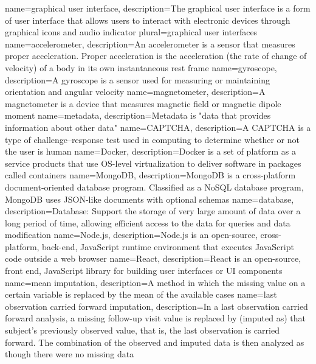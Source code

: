 {
    name={graphical user interface},
    description={The graphical user interface is a form of user interface that allows users to interact with electronic devices through graphical icons and audio indicator}
    plural={graphical user interfaces}
}
{
    name={accelerometer},
    description={An accelerometer is a sensor that measures proper acceleration. Proper acceleration is the acceleration (the rate of change of velocity) of a body in its own instantaneous rest frame
    }
}
{
    name={gyroscope},
    description={A gyroscope is a sensor used for measuring or maintaining orientation and angular velocity
    }
}
{
    name={magnetometer},
    description={A magnetometer is a device that measures magnetic field or magnetic dipole moment}
}
{
    name={metadata},
    description={Metadata is "data that provides information about other data"}
}
{
    name={CAPTCHA},
    description={A CAPTCHA is a type of challenge–response test used in computing to determine whether or not the user is human}
}
{
    name={Docker},
    description={Docker is a set of platform as a service products that use OS-level virtualization to deliver software in packages called containers}
}
{
    name={MongoDB},
    description={MongoDB is a cross-platform document-oriented database program. Classified as a NoSQL database program, MongoDB uses JSON-like documents with optional schemas}
}
{
    name={database},
    description={Database: Support the storage of very large amount of data over a long period of time, allowing efficient access to the data for queries and data modification}
}
{
    name={Node.js},
    description={Node.js is an open-source, cross-platform, back-end, JavaScript runtime environment that executes JavaScript code outside a web browser}
}
{
    name={React},
    description={React is an open-source, front end, JavaScript library for building user interfaces or UI components}
}
{
    name={mean imputation},
    description={A method in which the missing value on a certain variable is replaced by the mean of the available cases}
}
{
    name={last observation carried forward imputation},
    description={In a last observation carried forward analysis, a missing follow-up visit value is replaced by (imputed as) that subject's previously observed value, that is, the last observation is carried forward. The combination of the observed and imputed data is then analyzed as though there were no missing data}
}
